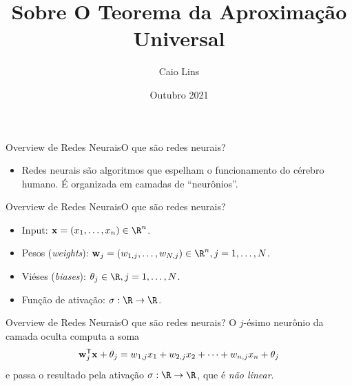 \documentclass[13pt]{beamer}
\title[Teorema da Aproximação Universal]{Sobre O Teorema da Aproximação Universal}
\author[C. Lins]{{Caio Lins}}
\institute[EMAp]{FGV - EMAp}
\date[EMAp 2021]{Outubro 2021}
\begin{document}
\maketitle


\begin{frame}{Overview de Redes Neurais}{O que são redes neurais?}
    \begin{itemize}
        \item Redes neurais são algoritmos que espelham o funcionamento do cérebro humano.
            É organizada em camadas de ``neurônios''.
    \end{itemize}
    \begin{figure}
        \begin{center}
            
        \end{center}
    \end{figure}
\end{frame}

\begin{frame}{Overview de Redes Neurais}{O que são redes neurais?}
    \begin{itemize}
        \item Input: \( \bfx = ( x_{ 1 }, \dots, x_{ n } ) \in \R^{ n } \).
        \item Pesos (\emph{weights}): \( \bfw_{ j } = ( w_{ 1, j }, \dots, w_{ N, j } ) \in \R^{ n }, j = 1, \dots, N \).
        \item Viéses (\emph{biases}): \( \theta_{ j } \in \R , j = 1, \dots, N\).
        \item Função de ativação: \( \sigma : \R \to \R \).
    \end{itemize}
    \begin{center}
        
    \end{center}
\end{frame}

\begin{frame}{Overview de Redes Neurais}{O que são redes neurais?}
    \vspace{2pt}
    O \( j \)-ésimo neurônio da camada oculta computa a soma
    \begin{equation*}
        \mathbf{w}_{ j }^{ \mathsf{T} } \mathbf{x} + \theta_{ j } = w_{ 1, j }x_{ 1 } + w_{ 2,j } x_{ 2 } + \cdots + w_{ n, j } x_{ n } + \theta_{ j }
    \end{equation*}
    e passa o resultado pela ativação \( \sigma : \R \to \R \), que é \emph{não linear}.
    \begin{center}
        
    \end{center}
\end{frame}
\end{document}
